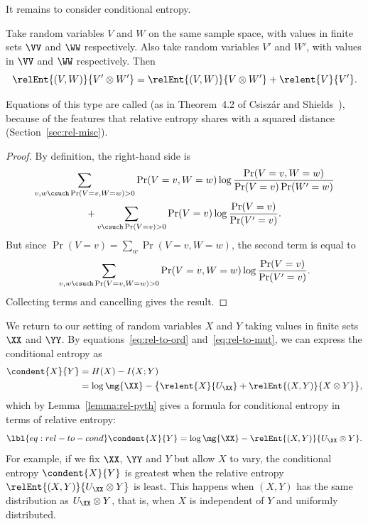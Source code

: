 It remains to consider conditional%
%
% 
entropy.

\begin{lemma}
Take random variables $V$ and $W$ on the same sample space, with values in
finite sets $\VV$ and $\WW$ respectively.  Also take random variables $V'$
and $W'$, with values in $\VV$ and $\WW$ respectively.  Then
\[
\relEnt{(V, W)}{V' \otimes W'}
=
\relEnt{(V, W)}{V \otimes W'} + \relent{V}{V'}.
\]
\end{lemma}
% 
Equations of this type are called  (as in Theorem~4.2 of Csisz\'ar and Shields~\cite{CsSh}),
because of the features that relative%
%
% 
entropy shares with a squared distance (Section~\ref{sec:rel-misc}).

\begin{proof}
By definition, the right-hand side is
% 
\begin{multline*}
\sum_{v, w \csuch \Pr(V = v, W = w) > 0}
\Pr(V = v, W = w) \log \frac{\Pr(V = v, W = w)}{\Pr(V = v)\Pr(W' = w)}
\\
+
\sum_{v \csuch \Pr(V = v) > 0} 
\Pr(V = v) \log \frac{\Pr(V = v)}{\Pr(V' = v)}.
\end{multline*}
% 
But since $\Pr(V = v) = \sum_w \Pr(V = v, W = w)$, the second term is equal
to
\[
\sum_{v, w \csuch \Pr(V = v, W = w) > 0} 
\Pr(V = v, W = w) \log \frac{\Pr(V = v)}{\Pr(V' = v)}.
\]
Collecting terms and cancelling gives the result.
\end{proof}

We return to our setting of random variables $X$ and $Y$ taking values in
finite sets $\XX$ and $\YY$.  By equations~\eqref{eq:rel-to-ord}
and~\eqref{eq:rel-to-mut}, we can express the conditional entropy as
% 
\begin{align*}
\condent{X}{Y}   &
=
H(X) - I(X; Y)  \\
&
=
\log\mg{\XX} - 
\bigl\{ \relent{X}{U_{\XX}} + \relEnt{(X, Y)}{X \otimes Y} \bigr\},
\end{align*}
% 
which by Lemma~\ref{lemma:rel-pyth} gives a formula for conditional entropy
in terms of relative entropy:
% 
\begin{equation}
\lbl{eq:rel-to-cond}
\condent{X}{Y} 
=
\log\mg{\XX} - \relEnt{(X, Y)}{U_{\XX} \otimes Y}.
\end{equation}
% 
For example, if we fix $\XX$, $\YY$ and $Y$ but allow $X$ to vary, the
conditional entropy $\condent{X}{Y}$ is greatest when the relative entropy
$\relEnt{(X, Y)}{U_{\XX} \otimes Y}$ is least.  This happens when $(X, Y)$
has the same distribution as $U_{\XX} \otimes Y$, that is, when $X$ is
independent of $Y$ and uniformly distributed.

